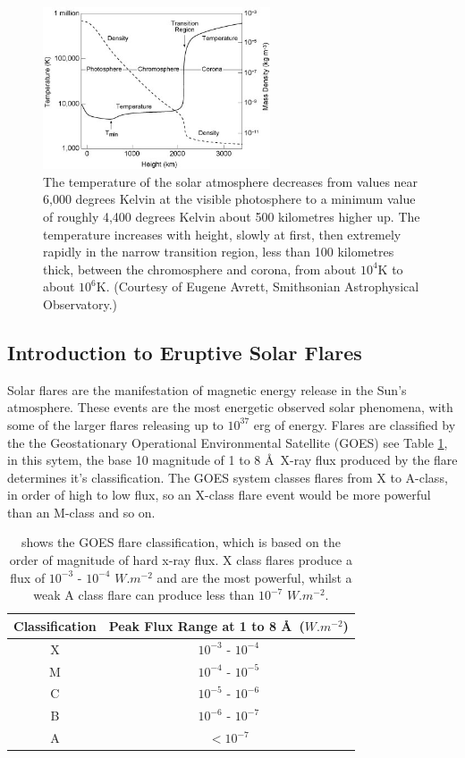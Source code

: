 \begin{figure}[H]
  \begin{center}
    \includegraphics[width=0.6\textwidth]{solar-atm-plot}
\caption{The temperature of the solar atmosphere decreases from values near 6,000 degrees Kelvin at the visible photosphere to a minimum value of roughly 4,400 degrees Kelvin about 500 kilometres higher up. The temperature increases with height, slowly at first, then extremely rapidly in the narrow transition region, less than 100 kilometres thick, between the chromosphere and corona, from about $10^{4}$K to about $10^{6}$K. (Courtesy of Eugene Avrett, Smithsonian Astrophysical Observatory.)}\label{solatm}
  \end{center}
\end{figure}


\subsection{Introduction to Eruptive Solar Flares}

Solar flares are the manifestation of magnetic energy release in the Sun's atmosphere. These events are the most energetic observed solar phenomena, with some of the larger flares releasing up to $10^{37}$ erg of energy. Flares are classified by the the Geostationary Operational Environmental Satellite (GOES) see Table \ref{goes}, in this sytem, the base 10 magnitude of 1 to 8 \AA\ X-ray flux produced by the flare determines it's classification. The GOES system classes flares from X to A-class, in order of high to low flux, so an X-class flare event would be more powerful than an M-class and so on.   \\

\begin{table}[h]
\centering
\begin{tabular}{|c|c|}\label{GOES}
Classification & Peak Flux Range at 1 to 8 \AA\ ($W.m^{-2}$)\\
\hline
X & $10^{-3}$ - $10^{-4}$\\
M & $10^{-4}$ - $10^{-5}$\\
C & $10^{-5}$ - $10^{-6}$\\
B & $10^{-6}$ - $10^{-7}$\\
A & $<10^{-7}$\\
\end{tabular}
\caption{shows the GOES flare classification, which is based on the order of magnitude of hard x-ray flux. X class flares produce a flux of $10^{-3}$ - $10^{-4}$ $W.m^{-2}$ and are the most powerful, whilst a weak A class flare can produce less than $10^{-7}$ $W.m^{-2}$.}\label{goes}
\end{table}


